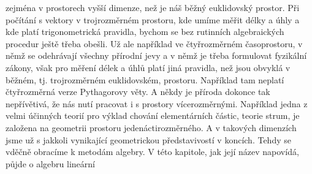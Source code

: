   zejména v prostorech vyšší dimenze, než je náš běžný euklidovský prostor. Při počítání s vektory v
  trojrozměrném prostoru, kde umíme měřit délky a úhly a kde platí trigonometrická pravidla, bychom
  se bez rutinních algebraických procedur ještě třeba obešli. Už ale například ve čtyřrozměrném
  časoprostoru, v němž se odehrávají všechny přírodní jevy a v němž je třeba formulovat fyzikální
  zákony, však pro měření délek a úhlů platí jiná pravidla, než jsou obvyklá v běžném, tj.
  trojrozměrném euklidovském, prostoru. Například tam neplatí čtyřrozměrná verze Pythagorovy věty. A
  někdy je příroda dokonce tak nepřívětivá, že nás nutí pracovat i s prostory vícerozměrnými.
  Například jedna z velmi účinných teorií pro výklad chování elementárních částic, teorie strum, je
  založena na geometrii prostoru jedenáctirozměrného. A v takových dimenzích jsme už s jakkoli
  vynikající geometrickou představivostí v koncích. Tehdy se vděčně obracíme k metodám algebry. V
  této kapitole, jak její název napovídá, půjde o algebru lineární
  
